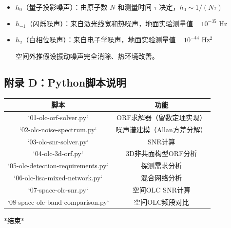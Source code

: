 \documentclass[12pt,a4paper]{article}
\begin{document}
\begin{itemize}
  \item $h_0$（量子投影噪声）：由原子数 $N$ 和测量时间 $\tau$ 决定，$h_0 \sim 1/(N\tau)$
  \item $h_{-1}$（闪烁噪声）：来自激光线宽和热噪声，地面实验测量值 ~ $10^{-35}$ Hz
  \item $h_2$（白相位噪声）：来自电子学噪声，地面实验测量值 ~ $10^{-44}$ Hz$^2$

空间外推假设振动噪声完全消除、热环境改善。

\end{itemize}
\subsection{附录 D：Python脚本说明}


\begin{tabular}{|c|c|}
\hline
脚本 & 功能 \\
\hline
`01-olc-orf-solver.py` & ORF求解器（留数定理实现） \\
`02-olc-noise-spectrum.py` & 噪声谱建模（Allan方差分解） \\
`03-olc-snr-solver.py` & SNR计算 \\
`04-olc-3d-orf.py` & 3D非共面构型ORF分析 \\
`05-olc-detection-requirements.py` & 探测需求分析 \\
`06-olc-lisa-mixed-network.py` & 混合网络分析 \\
`07-space-olc-snr.py` & 空间OLC SNR计算 \\
`08-space-olc-band-comparison.py` & 空间OLC频段对比 \\
\hline
\end{tabular}



*结束*
\end{document}
